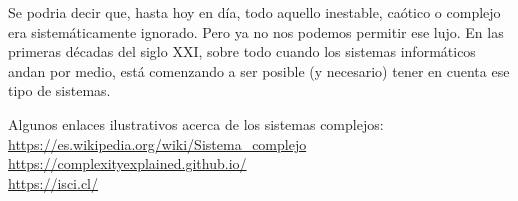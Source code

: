 \documentclass[10pt,a4paper]{article}
\begin{document}
Se podria decir que, hasta hoy en día, todo aquello inestable, caótico o complejo era sistemáticamente ignorado. Pero ya no nos podemos permitir ese lujo. En las primeras décadas del siglo XXI, sobre todo cuando los sistemas informáticos andan por medio, está comenzando a ser posible (y necesario) tener en cuenta ese tipo de sistemas.

\hspace{1cm}

Algunos enlaces ilustrativos acerca de los sistemas complejos:
\\ \url{https://es.wikipedia.org/wiki/Sistema_complejo}
\\ \url{https://complexityexplained.github.io/}
\\ \url{https://isci.cl/}
\end{document}
